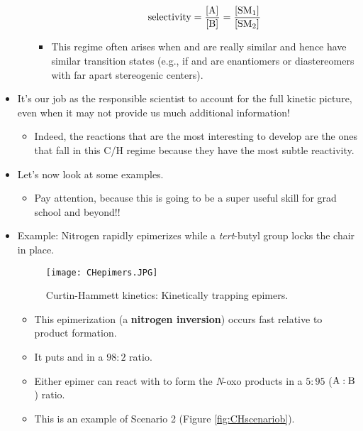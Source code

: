 \documentclass[../notes.tex]{subfiles}
\begin{document}
\begin{itemize}
\begin{enumerate}
\begin{itemize}
            \begin{equation*}
                \text{selectivity} = \frac{\cnc{A}}{\cnc{B}}
                = \frac{\cnc{SM1}}{\cnc{SM2}}
            \end{equation*}
            \item This regime often arises when  and  are really similar and hence have similar transition states (e.g., if  and  are enantiomers or diastereomers with far apart stereogenic centers).
        \end{itemize}
    \end{enumerate}
    \item It's our job as the responsible scientist to account for the full kinetic picture, even when it may not provide us much additional information!
    \begin{itemize}
        \item Indeed, the reactions that are the most interesting to develop are the ones that fall in this C/H regime because they have the most subtle reactivity.
    \end{itemize}
    \item Let's now look at some examples.
    \begin{itemize}
        \item Pay attention, because this is going to be a super useful skill for grad school and beyond!!
    \end{itemize}
    \item Example: Nitrogen rapidly epimerizes while a \emph{tert}-butyl group locks the chair in place.
    \begin{figure}[h!]
        \centering
        \texttt{[image: CHepimers.JPG]}
        \caption{Curtin-Hammett kinetics: Kinetically trapping epimers.}
        \label{fig:CHepimers}
    \end{figure}
    \begin{itemize}
        \item This epimerization (a \textbf{nitrogen inversion}) occurs fast relative to product formation.
        \item It puts  and  in a $98:2$ ratio.
        \item Either epimer can react with  to form the \emph{N}-oxo products in a $5:95$ ($\ce{A}:\ce{B}$) ratio.
        \item This is an example of Scenario 2 (Figure \ref{fig:CHscenariob}).
        \begin{itemize}

\end{itemize}
\end{itemize}
\end{itemize}
\end{document}

